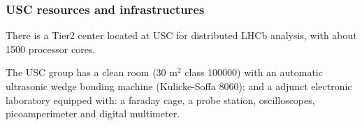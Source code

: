 %
%

\subsubsection*{USC resources and infrastructures}


There is a Tier2 center located at USC for distributed LHCb analysis, with about 1500 processor cores.

The USC group has a clean room (30 m$^2$ class 100000) with an automatic ultrasonic wedge bonding machine (Kulicke-Soffa 8060); and a adjunct electronic laboratory equipped with: a faraday cage, a probe station, oscilloscopes, picoamperimeter and digital multimeter.

